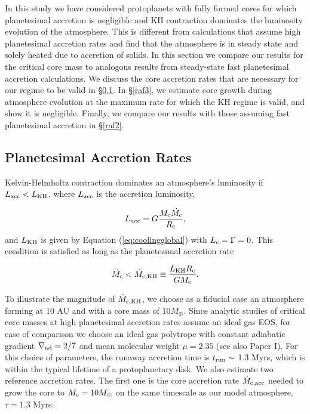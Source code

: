 \documentclass[apj]{emulateapj}
\newcommand{\delad}{\nabla_{\rm ad}}
\newcommand{\co}{_{\rm c}}
\begin{document}
In this study we have considered protoplanets with fully formed cores for which planetesimal accretion is negligible and KH contraction dominates the luminosity evolution of the atmosphere. This is different from calculations that assume high planetesimal accretion rates and find that the atmosphere is in steady state and solely heated due to accretion of solids. In this section we compare our results for the critical core mass to analogous results from steady-state fast planetesimal accretion calculations. We discuss the core accretion rates that are necessary for our regime to be valid in \S\ref{raf1}. In \S\ref{raf3}, we estimate core growth during atmosphere evolution at the maximum rate for which the KH regime is valid, and show it is negligible. Finally, we compare our results with those assuming fast planetesimal accretion in \S\ref{raf2}.


\subsection{Planetesimal Accretion Rates}
\label{raf1}

Kelvin-Helmholtz contraction dominates an atmosphere's luminosity if  $L_{\mathrm{acc}} < L_{\rm{KH}}$, where $L_{\rm{acc}}$ is the accretion luminosity,

\begin{equation}
\label{eq:Lacc}
L_{acc}=G \frac{M_{\rm{c}} \dot{M_{\rm{c}}}}{R_{\rm{c}}},
\end{equation}
and $L_{\rm KH}$ is given by Equation (\ref{eq:coolingglobal}) with $L\co=\Gamma=0$. This condition is satisfied as long as the planetesimal accretion rate 

\begin{equation}
\label{eq:McdotKH}
\dot{M\co}<\dot{M}_{\rm c, KH} \equiv \frac{L_{\rm KH} R\co}{G M\co}.
\end{equation} 

To illustrate the magnitude of $\dot{M}_{\rm c, KH}$, we choose as a fiducial case an atmosphere forming at 10 AU and with a core mass of $10 M_{\oplus}$. Since analytic studies of critical core masses at high planetesimal accretion rates assume an ideal gas EOS, for ease of comparison we choose an ideal gas polytrope with constant adiabatic gradient $\delad=2/7$ and mean molecular weight $\mu=2.35$ (see also Paper I). For this choice of parameters, the runaway accretion time is $t _{\rm run}\sim$ 1.3 Myrs, which is within the typical lifetime of a protoplanetary disk. We also estimate two reference accretion rates. The first one is the core accretion rate $\dot{M}_{\rm c, acc}$ needed to grow the core to $M\co=10 M_{\oplus}$ on the same timescale as our model atmosphere, $\tau=1.3$ Myrs:
\end{document}
